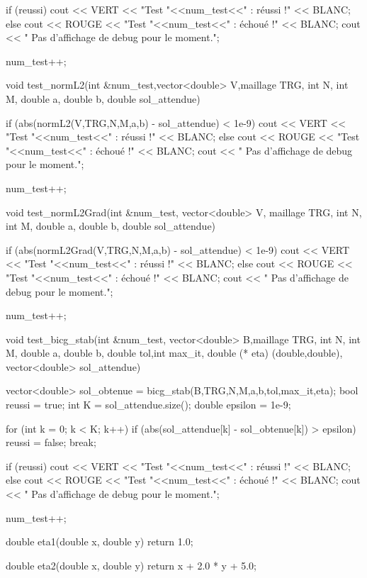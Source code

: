 \begin{codeblock}
{    if (reussi){
        cout << VERT << "Test "<<num_test<<" : réussi !\n" << BLANC;
    } else {
        cout << ROUGE << "Test "<<num_test<<" : échoué !\n" << BLANC;
        cout << "   Pas d'affichage de debug pour le moment.\n";
    }

    num_test++;
}


void test_normL2(int &num_test,vector<double> V,maillage TRG, int N, int M, double a,
    double b, double sol_attendue){

    if (abs(normL2(V,TRG,N,M,a,b) - sol_attendue) < 1e-9){
        cout << VERT << "Test "<<num_test<<" : réussi !\n" << BLANC;
    } else {
        cout << ROUGE << "Test "<<num_test<<" : échoué !\n" << BLANC;
        cout << "   Pas d'affichage de debug pour le moment.\n";
    }

    num_test++;
}


void test_normL2Grad(int &num_test, vector<double> V, maillage TRG, int N, int M,
    double a, double b, double sol_attendue){

    if (abs(normL2Grad(V,TRG,N,M,a,b) - sol_attendue) < 1e-9){
        cout << VERT << "Test "<<num_test<<" : réussi !\n" << BLANC;
    } else {
        cout << ROUGE << "Test "<<num_test<<" : échoué !\n" << BLANC;
        cout << "   Pas d'affichage de debug pour le moment.\n";
    }

    num_test++;
}



void test_bicg_stab(int &num_test, vector<double> B,maillage TRG, int N, int M,
    double a, double b, double tol,int max_it, double (* eta) (double,double),
    vector<double> sol_attendue){

    vector<double> sol_obtenue = bicg_stab(B,TRG,N,M,a,b,tol,max_it,eta);
    bool reussi = true;
    int K = sol_attendue.size();
    double epsilon = 1e-9;

    for (int k = 0; k < K; k++){
        if (abs(sol_attendue[k] - sol_obtenue[k]) > epsilon){
            reussi = false;
            break;
        }
    }

    if (reussi){
        cout << VERT << "Test "<<num_test<<" : réussi !\n" << BLANC;
    } else {
        cout << ROUGE << "Test "<<num_test<<" : échoué !\n" << BLANC;
        cout << "   Pas d'affichage de debug pour le moment.\n";
    }

    num_test++;
}


double eta1(double x, double y) {
    return 1.0;
}

double eta2(double x, double y) {
    return x + 2.0 * y + 5.0;
}


\end{codeblock}
